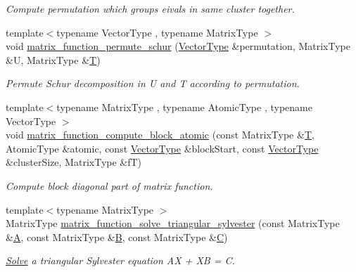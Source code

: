 \begin{DoxyCompactItemize}
\begin{DoxyCompactList}\small\item\em Compute permutation which groups ei\textquotesingle{}vals in same cluster together. \end{DoxyCompactList}\item 
\mbox{\label{namespace_eigen_1_1internal_a59cacdc2f9b480da246258bc9399aa2c}} 
{\footnotesize template$<$typename Vector\+Type , typename Matrix\+Type $>$ }\\void \hyperlink{namespace_eigen_1_1internal_a59cacdc2f9b480da246258bc9399aa2c}{matrix\+\_\+function\+\_\+permute\+\_\+schur} (\hyperlink{struct_vector_type}{Vector\+Type} \&permutation, Matrix\+Type \&U, Matrix\+Type \&\hyperlink{group___sparse_core___module}{T})
\begin{DoxyCompactList}\small\item\em Permute Schur decomposition in U and T according to permutation. \end{DoxyCompactList}\item 
{\footnotesize template$<$typename Matrix\+Type , typename Atomic\+Type , typename Vector\+Type $>$ }\\void \hyperlink{namespace_eigen_1_1internal_a53e617df189868a791e44d2c4e94403f}{matrix\+\_\+function\+\_\+compute\+\_\+block\+\_\+atomic} (const Matrix\+Type \&\hyperlink{group___sparse_core___module}{T}, Atomic\+Type \&atomic, const \hyperlink{struct_vector_type}{Vector\+Type} \&block\+Start, const \hyperlink{struct_vector_type}{Vector\+Type} \&cluster\+Size, Matrix\+Type \&fT)
\begin{DoxyCompactList}\small\item\em Compute block diagonal part of matrix function. \end{DoxyCompactList}\item 
{\footnotesize template$<$typename Matrix\+Type $>$ }\\Matrix\+Type \hyperlink{namespace_eigen_1_1internal_a9f7e5b9803071057e7ed4e887da4a1bb}{matrix\+\_\+function\+\_\+solve\+\_\+triangular\+\_\+sylvester} (const Matrix\+Type \&\hyperlink{group___core___module_class_eigen_1_1_matrix}{A}, const Matrix\+Type \&\hyperlink{group___core___module_class_eigen_1_1_matrix}{B}, const Matrix\+Type \&\hyperlink{group___core___module}{C})
\begin{DoxyCompactList}\small\item\em \hyperlink{group___core___module_class_eigen_1_1_solve}{Solve} a triangular Sylvester equation AX + XB = C. \end{DoxyCompactList}\item 

\end{DoxyCompactItemize}
